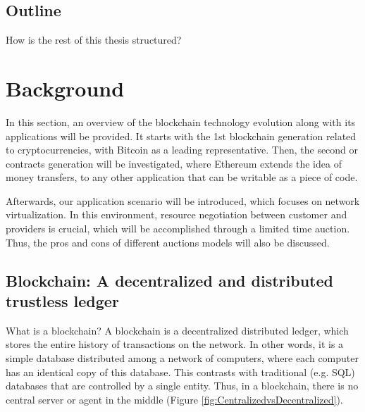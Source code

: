 \section{Outline}

How is the rest of this thesis structured?



\chapter{Background}
\label{ch:background}

In this section, an overview of the blockchain technology evolution along with its applications will be provided. It starts with the 1st blockchain generation related to cryptocurrencies, with Bitcoin as a leading representative. Then, the second or contracts generation will be investigated, where Ethereum extends the idea of money transfers, to any other application that can be writable as a piece of code.

Afterwards, our application scenario will be introduced, which focuses on network virtualization. In this environment, resource negotiation between customer and providers is crucial, which will be accomplished through a limited time auction. Thus, the pros and cons of different auctions models will also be discussed.

\section{Blockchain: A decentralized and distributed trustless ledger}

What is a blockchain? A blockchain is a decentralized distributed ledger, which stores the entire history of transactions on the network. In other words, it is a simple database distributed among a network of computers, where each computer has an identical copy of this database. This contrasts with traditional (e.g. SQL) databases that are controlled by a single entity. Thus, in a blockchain, there is no central server or agent in the middle (Figure \ref{fig:CentralizedvsDecentralized}).

